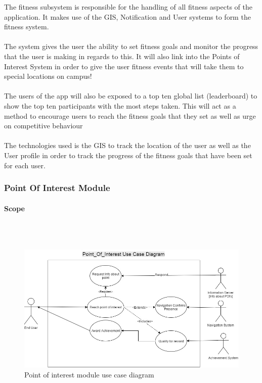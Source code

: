 \documentclass{article}
\begin{document}
			{The fitness subsystem is responsible for the handling of all fitness aspects of the application. It makes use of the GIS, Notification and User systems to form the fitness system.\\\\The system gives the user the ability to set fitness goals and monitor the progress that the user is making in regards to this. It will also link into the Points of Interest System in order to give the user fitness events that will take them to special locations on campus!\\\\The users of the app will also be exposed to a top ten global list (leaderboard) to show the top ten participants with the most steps taken. This will act as a method to encourage users to reach the fitness goals that they set as well as urge on competitive behaviour\\\\The technologies used is the GIS to track the location of the user as well as the User profile in order to track the progress of the fitness goals that have been set for each user.}		
		
		\newpage
		\subsubsection{Point Of Interest Module}
				\paragraph {Scope}\mbox{} \\\\
				\begin{figure}[h]
			            \includegraphics[width=\textwidth]{./Images/POI_Usecase.jpg} 
			            \caption{Point of interest module use case diagram}
			        \end{figure}
\end{document}
